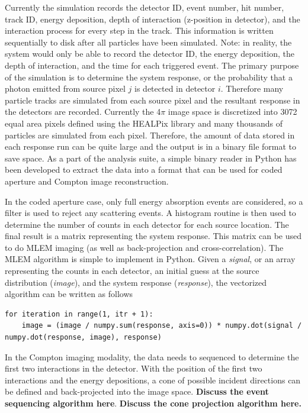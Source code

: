 \documentclass[10pt]{article}
\begin{document}
Currently the simulation records the detector ID, event number, hit number, track ID, energy deposition, depth of interaction (z-position in detector), and the interaction process for every step in the track. This information is written sequentially to disk after all particles have been simulated. Note: in reality, the system would only be able to record the detector ID, the energy deposition, the depth of interaction, and the time for each triggered event. The primary purpose of the simulation is to determine the system response, or the probability that a photon emitted from source pixel $j$ is detected in detector $i$. Therefore many particle tracks are simulated from each source pixel and the resultant response in the detectors are recorded. Currently the 4$\pi$ image space is discretized into 3072 equal area pixels defined using the HEALPix library \cite{Healpix2005} and many thousands of particles are simulated from each pixel. Therefore, the amount of data stored in each response run can be quite large and the output is in a binary file format to save space. As a part of the analysis suite, a simple binary reader in Python has been developed to extract the data into a format that can be used for coded aperture and Compton image reconstruction.

In the coded aperture case, only full energy absorption events are considered, so a filter is used to reject any scattering events. A histogram routine is then used to determine the number of counts in each detector for each source location. The final result is a matrix representing the system response. This matrix can be used to do MLEM imaging (as well as back-projection and cross-correlation). The MLEM algorithm is simple to implement in Python. Given a \emph{signal}, or an array representing the counts in each detector, an initial guess at the source distribution (\emph{image}), and the system response (\emph{response}), the vectorized algorithm can be written as follows

\begin{lstlisting}
for iteration in range(1, itr + 1):
	image = (image / numpy.sum(response, axis=0)) * numpy.dot(signal / numpy.dot(response, image), response)
\end{lstlisting}

In the Compton imaging modality, the data needs to sequenced to determine the first two interactions in the detector. With the position of the first two interactions and the energy depositions, a cone of possible incident directions can be defined and back-projected into the image space. \textbf{Discuss the event sequencing algorithm here}. \textbf{Discuss the cone projection algorithm here.}
\end{document}
